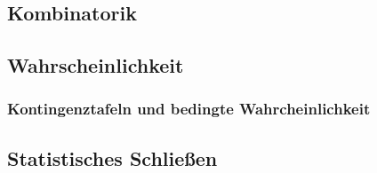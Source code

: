 \setcounter{aufgabenNummer}{1}
  \renewcommand{\kAufgabenBuchstabe}{S}


\subsection{Kombinatorik}

\subsection{Wahrscheinlichkeit}

\subsubsection{Kontingenztafeln und bedingte Wahrcheinlichkeit}

\subsection{Statistisches Schließen}
